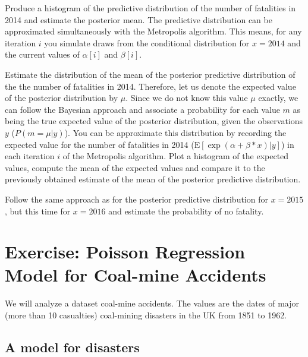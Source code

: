 
 
Produce a histogram of the predictive distribution of the number of fatalities in 2014 and estimate the posterior mean. 
The predictive distribution can be approximated simultaneously with the Metropolis algorithm. 
This means, for any iteration $i$ you simulate draws from the conditional distribution for $x = 2014$ and the current values of $\alpha[i]$ and $\beta[i]$.
 
Estimate the distribution of the mean of the posterior predictive distribution of the the number of fatalities in 2014. 
Therefore, let us denote the expected value of the posterior distribution by $\mu$. 
Since we do not know this value $\mu$ exactly, we can follow the Bayesian approach and associate a probability for each value $m$ as being the true expected value of the posterior distribution, given the observations $y$ ($P(m = \mu|y)$).
You can be approximate this distribution by recording the expected value for the number of fatalities in 2014 ($\text{E}[\exp(\alpha+\beta*x)|y]$) in each iteration $i$ of the Metropolis algorithm. 
Plot a histogram of the expected values, compute the mean of the expected values and compare it to the previously obtained estimate of the mean of the posterior predictive distribution.
 
Follow the same approach as for the posterior predictive distribution for $x = 2015$, but this time for $x = 2016$ and estimate the probability of no fatality. 
 
 
 
 

\newpage
\FloatBarrier
\section{Exercise: Poisson Regression Model for Coal-mine Accidents}
 
We will analyze a dataset coal-mine accidents.
The values are the dates of major (more than 10 casualties) coal-mining disasters in the UK from 1851 to 1962. 


\subsection{A model for disasters}

